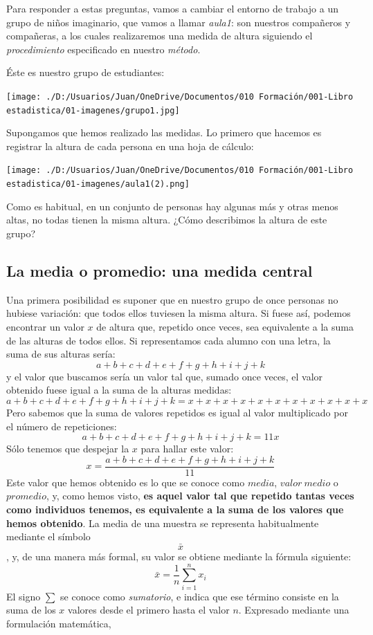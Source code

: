 \documentclass[
  letterpaper,
]{scrbook}
\begin{document}
Para responder a estas preguntas, vamos a cambiar el entorno de trabajo
a un grupo de niños imaginario, que vamos a llamar \emph{aula1}: son
nuestros compañeros y compañeras, a los cuales realizaremos una medida
de altura siguiendo el \emph{procedimiento} especificado en nuestro
\emph{método}.

Éste es nuestro grupo de estudiantes:

\texttt{[image: ./D:/Usuarios/Juan/OneDrive/Documentos/010 Formación/001-Libro estadistica/01-imagenes/grupo1.jpg]}

Supongamos que hemos realizado las medidas. Lo primero que hacemos es
registrar la altura de cada persona en una hoja de cálculo:

\texttt{[image: ./D:/Usuarios/Juan/OneDrive/Documentos/010 Formación/001-Libro estadistica/01-imagenes/aula1(2).png]}

Como es habitual, en un conjunto de personas hay algunas más y otras
menos altas, no todas tienen la misma altura. ¿Cómo describimos la
altura de este grupo?

\hypertarget{la-media-o-promedio-una-medida-central}{%
\subsection{La media o promedio: una medida
central}\label{la-media-o-promedio-una-medida-central}}

Una primera posibilidad es suponer que en nuestro grupo de once personas
no hubiese variación: que todos ellos tuviesen la misma altura. Si fuese
así, podemos encontrar un valor \(x\) de altura que, repetido once
veces, sea equivalente a la suma de las alturas de todos ellos. Si
representamos cada alumno con una letra, la suma de sus alturas sería:
\[
a+ b + c + d + e + f + g + h + i + j + k
\] y el valor que buscamos sería un valor tal que, sumado once veces, el
valor obtenido fuese igual a la suma de la alturas medidas: \[
a+b+c+d+e+f+g+h+i+j+k = x+x+x+x+x+x+x+x+x+x+x
\] Pero sabemos que la suma de valores repetidos es igual al valor
multiplicado por el número de repeticiones: \[
a+b+c+d+e+f+g+h+i+j+k = 11 x
\] Sólo tenemos que despejar la \(x\) para hallar este valor: \[
x = \frac{a+b+c+d+e+f+g+h+i+j+k}{11}
\] Este valor que hemos obtenido es lo que se conoce como \(media\),
\(valor{\ }medio\) o \(promedio\), y, como hemos visto, \textbf{es aquel
valor tal que repetido tantas veces como individuos tenemos, es
equivalente a la suma de los valores que hemos obtenido}. La media de
una muestra se representa habitualmente mediante el símbolo \[\bar{x}\],
y, de una manera más formal, su valor se obtiene mediante la fórmula
siguiente: \[
{\bar{x}={\frac {1}{n}}\sum _{i=1}^{n}x_{i}}
\] El signo \(\sum\) se conoce como \emph{sumatorio}, e indica que ese
término consiste en la suma de los \(x\) valores desde el primero hasta
el valor \(n\). Expresado mediante una formulación matemática,
\end{document}
